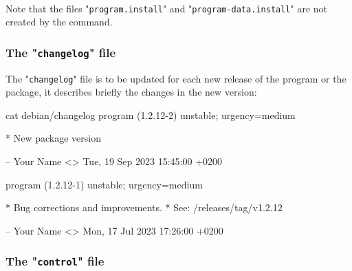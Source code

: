 \\
\noindent Note that the files "\texttt{program.install}" and "\texttt{program-data.install}" are not created by the  command.  
%
%
%
\subsubsection{The "\texttt{changelog}" file}

The "\texttt{changelog}" file is to be updated for each new release of the program or the package, 
it describes briefly the changes in the new version:
\begin{script}
 cat debian/changelog
program (1.2.12-2) unstable; urgency=medium

  * New package version

 -- Your Name <\email>  Tue, 19 Sep 2023 15:45:00 +0200

program (1.2.12-1) unstable; urgency=medium

  * Bug corrections and improvements.
  * See: \gitprog/releases/tag/v1.2.12

 -- Your Name <\email>  Mon, 17 Jul 2023 17:26:00 +0200
\end{script}

\subsubsection{The "\texttt{control}" file}

